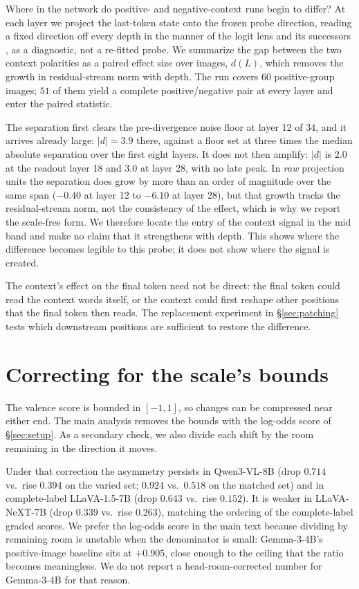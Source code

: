 \documentclass{article}
\newcommand{\gemma}{Gemma-3-4B}
\newcommand{\qwen}{Qwen3-VL-8B}
\newcommand{\llava}{LLaVA-1.5-7B}
\newcommand{\llavanext}{LLaVA-NeXT-7B}
\begin{document}
Where in the network do positive- and negative-context runs begin to differ? At each layer we project the last-token state onto the frozen probe direction, reading a fixed direction off every depth in the manner of the logit lens and its successors \citep{nostalgebraist2020, belrose2023}, as a diagnostic, not a re-fitted probe. We summarize the gap between the two context polarities as a paired effect size over images, $d(L)$, which removes the growth in residual-stream norm with depth. The run covers 60 positive-group images; $51$ of them yield a complete positive/negative pair at every layer and enter the paired statistic.

The separation first clears the pre-divergence noise floor at layer 12 of 34, and it arrives already large: $|d| = 3.9$ there, against a floor set at three times the median absolute separation over the first eight layers. It does not then amplify: $|d|$ is $2.0$ at the readout layer 18 and $3.0$ at layer 28, with no late peak. In \emph{raw} projection units the separation does grow by more than an order of magnitude over the same span ($-0.40$ at layer 12 to $-6.10$ at layer 28), but that growth tracks the residual-stream norm, not the consistency of the effect, which is why we report the scale-free form. We therefore locate the entry of the context signal in the mid band and make no claim that it strengthens with depth. This shows where the difference becomes legible to this probe; it does not show where the signal is created.

The context's effect on the final token need not be direct: the final token could read the context words itself, or the context could first reshape other positions that the final token then reads. The replacement experiment in \S\ref{sec:patching} tests which downstream positions are sufficient to restore the difference.

\section{Correcting for the scale's bounds}
\label{app:headroom}

The valence score is bounded in $[-1,1]$, so changes can be compressed near either end. The main analysis removes the bounds with the log-odds score of \S\ref{sec:setup}. As a secondary check, we also divide each shift by the room remaining in the direction it moves.

Under that correction the asymmetry persists in \qwen{} (drop $0.714$ vs.\ rise $0.394$ on the varied set; $0.924$ vs.\ $0.518$ on the matched set) and in complete-label \llava{} (drop $0.643$ vs.\ rise $0.152$). It is weaker in \llavanext{} (drop $0.339$ vs.\ rise $0.263$), matching the ordering of the complete-label graded scores. We prefer the log-odds score in the main text because dividing by remaining room is unstable when the denominator is small: \gemma{}'s positive-image baseline sits at $+0.905$, close enough to the ceiling that the ratio becomes meaningless. We do not report a head-room-corrected number for \gemma{} for that reason.
\end{document}
